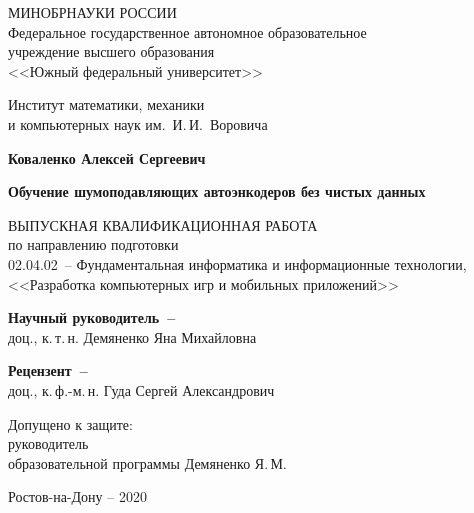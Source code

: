 


\thispagestyle{empty}
\begin{singlespacing} 
\begin{center}

МИНОБРНАУКИ РОССИИ\\ [12pt]
Федеральное государственное автономное образовательное\\
учреждение высшего образования\\
<<Южный федеральный университет>>

\vspace{\baselineskip}
Институт математики, механики\\
и компьютерных наук им.~И.\,И.~Воровича


\vfill
\textbf{Коваленко Алексей Сергеевич}

\vspace{15mm}
{\bf Обучение шумоподавляющих автоэнкодеров без чистых данных }

\vspace{15mm}
ВЫПУСКНАЯ КВАЛИФИКАЦИОННАЯ РАБОТА\\
по направлению подготовки\\
02.04.02~-- Фундаментальная информатика и информационные технологии,\\
<<Разработка компьютерных игр и мобильных приложений>>

\vspace{10mm}
\textbf{Научный руководитель~--}\\
 доц., к.\,т.\,н. Демяненко Яна Михайловна

\vspace{7mm}
\textbf{Рецензент~--}\\
доц., к.\,ф.-м.\,н. Гуда Сергей Александрович


\vspace{15mm}

\noindent
\begin{flushleft}
Допущено к защите:\\
руководитель \\
образовательной программы \underline{\hspace*{65mm}} Демяненко Я.\,М.
\end{flushleft}




\vfill
Ростов-на-Дону -- 2020

\end{center} 

\singlespacing
\end{singlespacing}